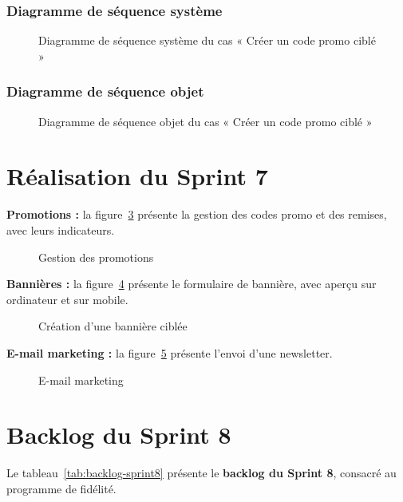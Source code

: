 \subsubsection{Diagramme de séquence système}
\begin{figure}[H]
    \centering
    \caption{Diagramme de séquence système du cas « Créer un code promo ciblé »}
    \label{fig:dss-coupon}
\end{figure}

\subsubsection{Diagramme de séquence objet}
\begin{figure}[H]
    \centering
    \caption{Diagramme de séquence objet du cas « Créer un code promo ciblé »}
    \label{fig:dso-coupon}
\end{figure}

\section{Réalisation du Sprint 7}
\textbf{Promotions :} la figure~\ref{fig:ui-promotions} présente la gestion des codes promo et des remises, avec leurs indicateurs.
\begin{figure}[H]
    \centering
    \caption{Gestion des promotions}
    \label{fig:ui-promotions}
\end{figure}

\textbf{Bannières :} la figure~\ref{fig:ui-bannieres} présente le formulaire de bannière, avec aperçu sur ordinateur et sur mobile.
\begin{figure}[H]
    \centering
    \caption{Création d'une bannière ciblée}
    \label{fig:ui-bannieres}
\end{figure}

\textbf{E-mail marketing :} la figure~\ref{fig:ui-email} présente l'envoi d'une newsletter.
\begin{figure}[H]
    \centering
    \caption{E-mail marketing}
    \label{fig:ui-email}
\end{figure}

\section{Backlog du Sprint 8}
Le tableau~\ref{tab:backlog-sprint8} présente le \textbf{backlog du Sprint 8}, consacré au programme de fidélité.

